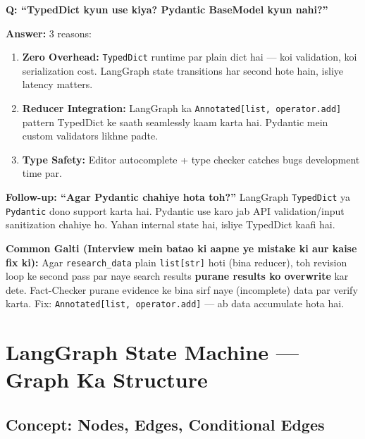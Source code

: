\documentclass[11pt, a4paper]{article}
\begin{document}
\begin{interviewbox}
\textbf{Q: ``TypedDict kyun use kiya? Pydantic BaseModel kyun nahi?''}

\textbf{Answer:} 3 reasons:
\begin{enumerate}[label=\textcolor{accentpurple}{\arabic*.}]
\item \textbf{Zero Overhead:} \texttt{TypedDict} runtime par plain dict hai --- koi validation, koi serialization cost. LangGraph state transitions har second hote hain, isliye latency matters.
\item \textbf{Reducer Integration:} LangGraph ka \texttt{Annotated[list, operator.add]} pattern TypedDict ke saath seamlessly kaam karta hai. Pydantic mein custom validators likhne padte.
\item \textbf{Type Safety:} Editor autocomplete + type checker catches bugs development time par.
\end{enumerate}

\textbf{Follow-up: ``Agar Pydantic chahiye hota toh?''} LangGraph \texttt{TypedDict} ya \texttt{Pydantic} dono support karta hai. Pydantic use karo jab API validation/input sanitization chahiye ho. Yahan internal state hai, isliye TypedDict kaafi hai.
\end{interviewbox}

\begin{warningbox}
\textbf{Common Galti (Interview mein batao ki aapne ye mistake ki aur kaise fix ki):}
Agar \texttt{research\_data} plain \texttt{list[str]} hoti (bina reducer), toh revision loop ke second pass par naye search results \textbf{purane results ko overwrite} kar dete. Fact-Checker purane evidence ke bina sirf naye (incomplete) data par verify karta. Fix: \texttt{Annotated[list, operator.add]} --- ab data accumulate hota hai.
\end{warningbox}

\section{LangGraph State Machine --- Graph Ka Structure}

\subsection{Concept: Nodes, Edges, Conditional Edges}
\end{document}
